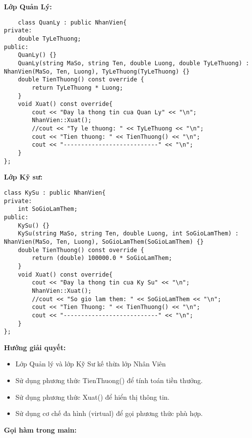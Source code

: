 \item{\textbf{Lớp Quản Lý: }}
\begin{verbatim}
    class QuanLy : public NhanVien{
private: 
    double TyLeThuong;
public:
    QuanLy() {}
    QuanLy(string MaSo, string Ten, double Luong, double TyLeThuong) : NhanVien(MaSo, Ten, Luong), TyLeThuong(TyLeThuong) {}
    double TienThuong() const override {
        return TyLeThuong * Luong;
    }
    void Xuat() const override{ 
        cout << "Đay la thong tin cua Quan Ly" << "\n";
        NhanVien::Xuat();
        //cout << "Ty le thuong: " << TyLeThuong << "\n";
        cout << "Tien thuong: " << TienThuong() << "\n";
        cout << "---------------------------" << "\n";
    }
};
\end{verbatim}
\item{\textbf{Lớp Kỹ sư: }}
\begin{verbatim}
class KySu : public NhanVien{
private:
    int SoGioLamThem;
public:
    KySu() {}
    KySu(string MaSo, string Ten, double Luong, int SoGioLamThem) : NhanVien(MaSo, Ten, Luong), SoGioLamThem(SoGioLamThem) {}
    double TienThuong() const override {
        return (double) 100000.0 * SoGioLamThem;
    }
    void Xuat() const override{
        cout << "Đay la thong tin cua Ky Su" << "\n";
        NhanVien::Xuat();
        //cout << "So gio lam them: " << SoGioLamThem << "\n";
        cout << "Tien Thuong: " << TienThuong() << "\n";
        cout << "---------------------------" << "\n";
    }
};
\end{verbatim}
\item{\textbf{Hướng giải quyết:}}
\begin{itemize}
    \item Lớp Quản lý và lớp Kỹ Sư kế thừa lớp Nhân Viên
    \item Sử dụng phương thức TienThuong() để tính toán tiền thưởng.
    \item Sử dụng phương thức Xuat() để hiển thị thông tin.
    \item Sử dụng cơ chế đa hình (virtual) để gọi phương thức phù hợp.
\end{itemize}
\item{\textbf{Gọi hàm trong main:}}

